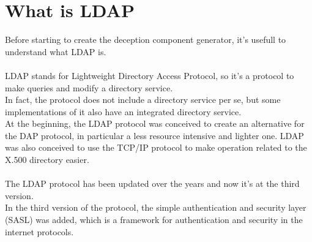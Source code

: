 \chapter{What is LDAP}
Before starting to create the deception component generator, it's usefull to understand what LDAP is.
\\\\
LDAP stands for Lightweight Directory Access Protocol, so it’s a protocol to make queries and modify a directory service.  
\\
In fact, the protocol does not include a directory service per se, but some implementations of it also have an integrated directory service. 
\\
At the beginning, the LDAP protocol was conceived to create an alternative for the DAP protocol, in particular a less resource intensive and lighter one. LDAP was also conceived to use the TCP/IP protocol to make operation related to the X.500 directory easier.  
\\\\
The LDAP protocol has been updated over the years and now it’s at the third version. 
\\
In the third version of the protocol, the simple authentication and security layer (SASL) was added, which is a framework for authentication and security in the internet protocols. 
\\\\
